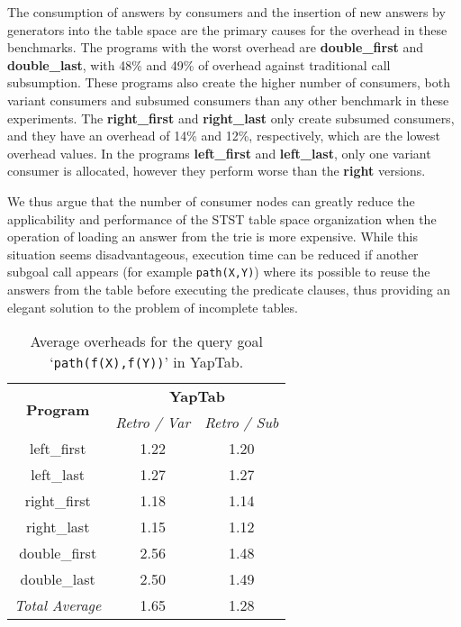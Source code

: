 The consumption of answers by consumers and the insertion of new answers by generators into the table
space are the primary causes for the overhead in these benchmarks. The programs with the
worst overhead are \textbf{double\_first} and \textbf{double\_last}, with 48\% and 49\% of overhead
against traditional call subsumption. These programs also create the higher number of consumers,
both variant consumers and subsumed consumers than any other benchmark in these experiments.
The \textbf{right\_first} and \textbf{right\_last} only create subsumed consumers, and they have an overhead
of 14\% and 12\%, respectively, which are the lowest overhead values. In the programs \textbf{left\_first} and
\textbf{left\_last}, only one variant consumer is allocated, however they perform worse than the \textbf{right} versions.

We thus argue that the number of consumer nodes can greatly reduce the
applicability and performance of the STST table space organization when the operation of loading an answer
from the trie is more expensive. While this situation seems disadvantageous, execution time can
be reduced if another subgoal call appears (for example \texttt{path(X,Y)}) where its possible to
reuse the answers from the table before executing the predicate clauses, thus providing an
elegant solution to the problem of incomplete tables.

\begin{table}[ht]
\centering
  \begin{tabular}{ccc}
   \hline
    \hline
    \multirow{2}{*}{\textbf{Program}} & \multicolumn{2}{c}{\textbf{YapTab}} \\
    & \textit{\small{Retro / Var}} & \textit{\small{Retro / Sub}} \\
   \hline
   \hline
   left\_first & 1.22 & 1.20 \\
   left\_last & 1.27 & 1.27 \\
   right\_first & 1.18 & 1.14 \\
   right\_last & 1.15 & 1.12 \\
double\_first & 2.56 & 1.48 \\
double\_last & 2.50 & 1.49 \\
\hline
\hline
\textit{Total Average} & 1.65 & 1.28 \\
\hline
\hline
\end{tabular}
\caption{Average overheads for the query goal `\texttt{path(f(X),f(Y))}' in YapTab.}
\label{tbl:results_average_stst}
\end{table}


